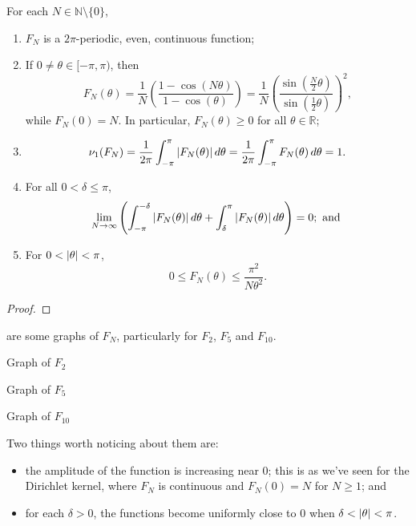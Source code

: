 \documentclass[notoc,notitlepage]{tufte-book}
\begin{document}
\begin{thm}\label{thm:properties_of_the_fejer_kernel}
  For each $N \in \mathbb{N} \setminus \{ 0 \}$,
  \begin{enumerate}
    \item $F_N$ is a $2\pi$-periodic, even, continuous function;
    \item If $0 \neq \theta \in [-\pi, \pi)$, then
      \begin{equation*}
        F_N(\theta)
        = \frac{1}{N} \left( \frac{1 - \cos(N\theta)}{1 - \cos(\theta)} \right)
        = \frac{1}{N} \left( \frac{\sin \left( \frac{N}{2} \theta \right)}
                            {\sin \left( \frac{1}{2} \theta \right)} \right)^2,
      \end{equation*}
      while $F_N(0) = N$.
      In particular, $F_N(\theta) \geq 0$ for all $\theta \in \mathbb{R}$;
    \item
      \begin{equation*}
        \nu_1(F_N)
        = \frac{1}{2\pi} \int_{-\pi}^{\pi} \left|F_N(\theta)\right| \mathop{}\!d{\theta}
        = \frac{1}{2\pi} \int_{-\pi}^{\pi} F_N(\theta) \mathop{}\!d{\theta} = 1.
      \end{equation*}
    \item For all $0 < \delta \leq \pi$,
      \begin{equation*}
        \lim_{N \to \infty} \left( 
          \int_{-\pi}^{-\delta} \left|F_N(\theta)\right| \mathop{}\!d{\theta} 
          + \int_{\delta}^{\pi} \left|F_N(\theta)\right| \mathop{}\!d{\theta}
        \right) = 0; \text{ and }
      \end{equation*}
    \item For $0 < \left|\theta\right| < \pi$,
      \begin{equation*}
        0 \leq F_N(\theta) \leq \frac{\pi^2}{N \theta^2}.
      \end{equation*}
  \end{enumerate}
\end{thm}

\begin{proof}
\end{proof}

 are some graphs of $F_N$,
particularly for $F_2$, $F_5$ and $F_{10}$.
\begin{marginfigure}
  \centering
  
  \caption{Graph of $F_2$}\label{fig:graph_of_f_2_}
  
  \caption{Graph of $F_5$}\label{fig:graph_of_f_5_}
  
  \caption{Graph of $F_{10}$}\label{fig:graph_of_f_10_}
\end{marginfigure}
Two things worth noticing about them are:
\begin{itemize}
  \item the amplitude of the function is increasing near $0$;
    this is as we've seen for the Dirichlet kernel,
    where $F_N$ is continuous and $F_N(0) = N$ for $N \geq 1$; and
  \item for each $\delta > 0$, the functions become uniformly
    close to $0$ when $\delta < \left|\theta\right| < \pi$.
\end{itemize}
\end{document}

